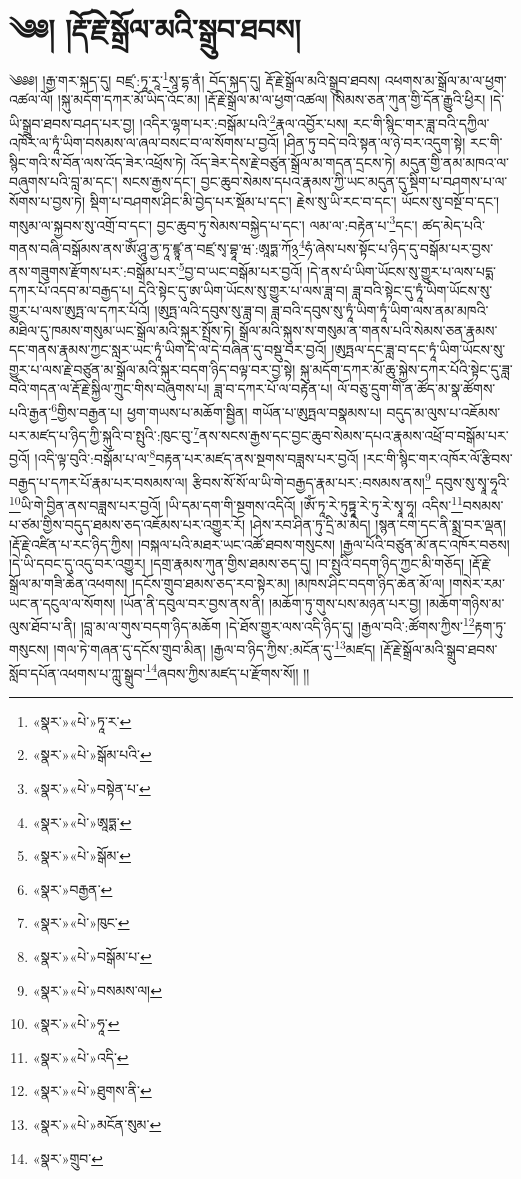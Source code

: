 \chapter{༄༅། །རྡོ་རྗེ་སྒྲོལ་མའི་སྒྲུབ་ཐབས།}༄༅༅། །རྒྱ་གར་སྐད་དུ། བཛྲ་:ཏཱ་རཱ་\footnote{«སྣར་»«པེ་»ཏཱ་ར་}སཱ་དྷ་ནཾ། བོད་སྐད་དུ། རྡོ་རྗེ་སྒྲོལ་མའི་སྒྲུབ་ཐབས། འཕགས་མ་སྒྲོལ་མ་ལ་ཕྱག་འཚལ་ལོ། །སྐུ་མདོག་དཀར་མོ་ཡིད་འོང་མ། །རྡོ་རྗེ་སྒྲོལ་མ་ལ་ཕྱག་འཚལ། །སེམས་ཅན་ཀུན་གྱི་དོན་རྒྱུའི་ཕྱིར། །དེ་ཡི་སྒྲུབ་ཐབས་བཤད་པར་བྱ། །འདིར་ལྷག་པར་:བསྒོམ་པའི་\footnote{«སྣར་»«པེ་»སྒོམ་པའི་}རྣལ་འབྱོར་པས། རང་གི་སྙིང་གར་ཟླ་བའི་དཀྱིལ་འཁོར་ལ་ཏཱཾ་ཡིག་བསམས་ལ་ཞལ་བསང་བ་ལ་སོགས་པ་བྱའོ། །ཤིན་ཏུ་བདེ་བའི་སྟན་ལ་ཉེ་བར་འདུག་སྟེ། རང་གི་སྙིང་གའི་ས་བོན་ལས་འོད་ཟེར་འཕྲོས་ཏེ། འོད་ཟེར་དེས་རྗེ་བཙུན་སྒྲོལ་མ་གདན་དྲངས་ཏེ། མདུན་གྱི་ནམ་མཁའ་ལ་བཞུགས་པའི་བླ་མ་དང་། སངས་རྒྱས་དང་། བྱང་ཆུབ་སེམས་དཔའ་རྣམས་ཀྱི་ཡང་མདུན་དུ་སྡིག་པ་བཤགས་པ་ལ་སོགས་པ་བྱས་ཏེ། སྡིག་པ་བཤགས་ཤིང་མི་བྱེད་པར་སྡོམ་པ་དང་། རྗེས་སུ་ཡི་རང་བ་དང་། ཡོངས་སུ་བསྔོ་བ་དང་། གསུམ་ལ་སྐྱབས་སུ་འགྲོ་བ་དང་། བྱང་ཆུབ་ཏུ་སེམས་བསྐྱེད་པ་དང་། ལམ་ལ་:བརྟེན་པ་\footnote{«སྣར་»«པེ་»བསྟེན་པ་}དང་། ཚད་མེད་པའི་གནས་བཞི་བསྒོམས་ནས་ཨོཾ་ཤཱུ་ནྱ་ཏཱ་ཛྙཱ་ན་བཛྲ་སྭ་བྷཱ་ཝ་:ཨཱཏྨ་ཀོ྅\footnote{«སྣར་»«པེ་»ཨཱཏྨ་}ཧཾ་ཞེས་པས་སྟོང་པ་ཉིད་དུ་བསྒོམ་པར་བྱས་ནས་གཟུགས་རྫོགས་པར་:བསྒོམ་པར་\footnote{«སྣར་»«པེ་»སྒོམ་}བྱ་བ་ཡང་བསྒོམ་པར་བྱའོ། །དེ་ནས་པཾ་ཡིག་ཡོངས་སུ་གྱུར་པ་ལས་པདྨ་དཀར་པོ་འདབ་མ་བརྒྱད་པ། དེའི་སྟེང་དུ་ཨ་ཡིག་ཡོངས་སུ་གྱུར་པ་ལས་ཟླ་བ། ཟླ་བའི་སྟེང་དུ་ཏཱཾ་ཡིག་ཡོངས་སུ་གྱུར་པ་ལས་ཨུཏྤ་ལ་དཀར་པོའོ། །ཨུཏྤ་ལའི་དབུས་སུ་ཟླ་བ། ཟླ་བའི་དབུས་སུ་ཏཱཾ་ཡིག་ཏཱཾ་ཡིག་ལས་ནམ་མཁའི་མཐིལ་དུ་ཁམས་གསུམ་ཡང་སྒྲོལ་མའི་སྐུར་སྤྲོས་ཏེ། སྒྲོལ་མའི་སྐུས་ས་གསུམ་ན་གནས་པའི་སེམས་ཅན་རྣམས་དང་གནས་རྣམས་ཀྱང་སླར་ཡང་ཏཱཾ་ཡིག་དེ་ལ་དེ་བཞིན་དུ་བསྡུ་བར་བྱའོ། །ཨུཏྤལ་དང་ཟླ་བ་དང་ཏཱཾ་ཡིག་ཡོངས་སུ་གྱུར་པ་ལས་རྗེ་བཙུན་མ་སྒྲོལ་མའི་སྐུར་བདག་ཉིད་བལྟ་བར་བྱ་སྟེ། སྐུ་མདོག་དཀར་མོ་ཆུ་སྐྱེས་དཀར་པོའི་སྟེང་དུ་ཟླ་བའི་གདན་ལ་རྡོ་རྗེ་སྐྱིལ་ཀྲུང་གིས་བཞུགས་པ། ཟླ་བ་དཀར་པོ་ལ་བརྟེན་པ། ལོ་བཅུ་དྲུག་གི་ན་ཚོད་མ་སྣ་ཚོགས་པའི་རྒྱན་\footnote{«སྣར་»བརྒྱན་}གྱིས་བརྒྱན་པ། ཕྱག་གཡས་པ་མཆོག་སྦྱིན། གཡོན་པ་ཨུཏྤལ་བསྣམས་པ། བདུད་མ་ལུས་པ་འཇོམས་པར་མཛད་པ་ཉིད་ཀྱི་སྐུའི་བ་སྤུའི་:ཁུང་བུ་\footnote{«སྣར་»«པེ་»ཁུང་}ནས་སངས་རྒྱས་དང་བྱང་ཆུབ་སེམས་དཔའ་རྣམས་འཕྲོ་བ་བསྒོམ་པར་བྱའོ། །འདི་ལྟ་བུའི་:བསྒོམ་པ་ལ་\footnote{«སྣར་»«པེ་»བསྒོམ་པ་}བརྟན་པར་མཛད་ནས་སྔགས་བཟླས་པར་བྱའོ། །རང་གི་སྙིང་གར་འཁོར་ལོ་རྩིབས་བརྒྱད་པ་དཀར་པོ་རྣམ་པར་བསམས་ལ། རྩིབས་སོ་སོ་ལ་ཡི་གེ་བརྒྱད་རྣམ་པར་:བསམས་ནས།\footnote{«སྣར་»«པེ་»བསམས་ལ།} དབུས་སུ་སྭཱ་ཧཱའི་\footnote{«སྣར་»«པེ་»ཧཱ་}ཡི་གེ་བྱིན་ནས་བཟླས་པར་བྱའོ། །ཡི་དམ་དག་གི་སྔགས་འདིའོ། །ཨོཾ་ཏཱ་རེ་ཏུཏྟཱ་རེ་ཏུ་རེ་སྭཱ་ཧཱ། འདིས་\footnote{«སྣར་»«པེ་»འདི་}བསམས་པ་ཙམ་གྱིས་བདུད་ཐམས་ཅད་འཇོམས་པར་འགྱུར་རོ། །ཤེས་རབ་ཤིན་ཏུ་དྲི་མ་མེད། །སྙན་ངག་དང་ནི་སྨྲ་བར་ལྡན། །རྡོ་རྗེ་འཛིན་པ་རང་ཉིད་ཀྱིས། །བསྐལ་པའི་མཐར་ཡང་འཚོ་ཐབས་གསུངས། །རྒྱལ་པོའི་བཙུན་མོ་ནང་འཁོར་བཅས། །དེ་ཡི་དབང་དུ་འདུ་བར་འགྱུར། །དགྲ་རྣམས་ཀུན་གྱིས་ཐམས་ཅད་དུ། །བ་སྤུའི་བདག་ཉིད་ཀྱང་མི་གཅོད། །རྡོ་རྗེ་སྒྲོལ་མ་གཟི་ཆེན་འཕགས། །དངོས་གྲུབ་ཐམས་ཅད་རབ་སྟེར་མ། །མཁས་ཤིང་བདག་ཉིད་ཆེན་མོ་ལ། །གསེར་རམ་ཡང་ན་དངུལ་ལ་སོགས། །ཡོན་ནི་དབུལ་བར་བྱས་ནས་ནི། །མཆོག་ཏུ་གུས་པས་མཉན་པར་བྱ། །མཆོག་གཉིས་མ་ལུས་ཐོབ་པ་ནི། །བླ་མ་ལ་གུས་བདག་ཉིད་མཆོག །དེ་ཐོས་གྱུར་ལས་འདི་ཉིད་དུ། །རྒྱལ་བའི་:ཚོགས་ཀྱིས་\footnote{«སྣར་»«པེ་»ཐུགས་ནི་}རྟག་ཏུ་གསུངས། །གལ་ཏེ་གཞན་དུ་དངོས་གྲུབ་མིན། །རྒྱལ་བ་ཉིད་ཀྱིས་:མངོན་དུ་\footnote{«སྣར་»«པེ་»མངོན་སུམ་}མཛད། །རྡོ་རྗེ་སྒྲོལ་མའི་སྒྲུབ་ཐབས་སློབ་དཔོན་འཕགས་པ་ཀླུ་སྒྲུབ་\footnote{«སྣར་»གྲུབ་}ཞབས་ཀྱིས་མཛད་པ་རྫོགས་སོ།། །།